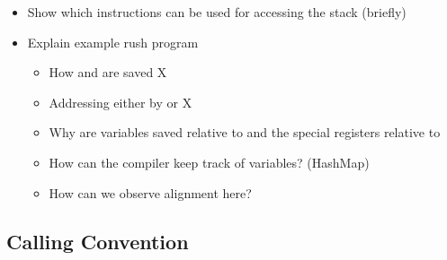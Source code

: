 
\begin{itemize}
	\item Show which instructions can be used for accessing the stack (briefly)
	\item Explain example rush program
	      \begin{itemize}
		      \item How   and  are saved X
		      \item Addressing either by  or  X
		      \item Why are variables saved relative to  and the special registers relative to 
		      \item How can the compiler keep track of variables? (HashMap)
		      \item How can we observe alignment here?
	      \end{itemize}
\end{itemize}

\lipsum[2-4]


\subsection{Calling Convention}\label{sec:riscv_calling_conv}

